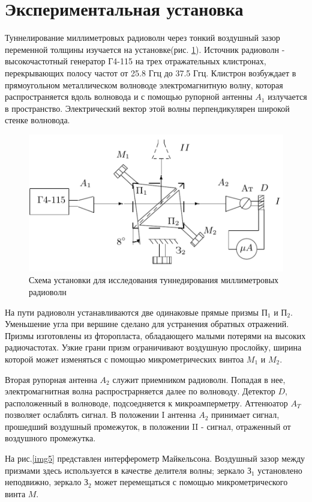 \documentclass[a4paper,12pt]{article}
\begin{document}
\section{Экспериментальная установка}

Туннелирование миллиметровых радиоволн через тонкий воздушный зазор переменной толщины изучается на установке(рис. \ref{img4}). Источник радиоволн - высокочастотный генератор Г4-115 на трех отражательных клистронах, перекрывающих полосу частот от 25.8 Ггц до 37.5 Ггц. Клистрон возбуждает в прямоугольном металлическом волноводе электромагнитную волну, которая распространяется вдоль волновода и с помощью рупорной антенны $A_1$ излучается в пространство. Электрический вектор этой волны перпендикулярен широкой стенке волновода.

\begin{figure}[h]
\centering
\includegraphics[width=0.7\linewidth]{img4.png}
\caption{Схема установки для исследования туннедирования миллиметровых радиоволн}
\label{img4}
\end{figure}

На пути радиоволн устанавливаются две одинаковые прямые призмы $\text{П}_1$ и $\text{П}_2$. Уменьшение угла при вершине сделано для устранения обратных отражений. Призмы изготовлены из фторопласта, обладающего малыми потерями на высоких радиочастотах. Узкие грани призм ограничивают воздушную прослойку, ширина которой может изменяться с помощью микрометрических винтоа $M_1$ и $M_2$. 

Вторая рупорная антенна $A_2$ служит приемником радиоволн. Попадая в нее, электромагнитная волна распрострарняется далее по волноводу. Детектор $D$, расположенный в волноводе, подсоедняется к микроамперметру. Аттенюатор $A_T$ позволяет ослаблять сигнал. В положении I антенна $A_2$ принимает сигнал, прошедший воздушный промежуток, в положении II - сигнал, отраженный от воздушного промежутка.

На рис.\ref{img5} представлен интерферометр Майкельсона. Воздушный зазор между призмами здесь используется в качестве делителя волны; зеркало $\text{З}_1$ установлено неподвижно, зеркало $\text{З}_2$ может перемещаться с помощью микрометрического винта $M$.
\end{document}

